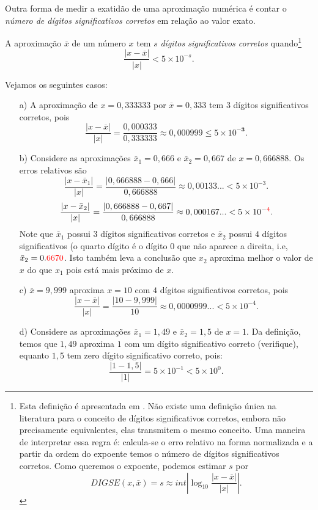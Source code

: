 Outra forma de medir a exatidão de uma aproximação numérica é contar o \emph{número de dígitos significativos corretos} em relação ao valor exato.

\begin{defn}
A aproximação $\overline{x}$ de um número $x$ tem $s$ \emph{dígitos significativos corretos} quando\footnote{Esta definição é apresentada em \cite{Burden2013}. Não existe uma definição única na literatura para o conceito de dígitos significativos corretos, embora não precisamente equivalentes, elas transmitem o mesmo conceito.
Uma maneira de interpretar essa regra é: calcula-se o erro relativo na forma normalizada e a partir da ordem do expoente temos o número de dígitos significativos corretos. Como queremos o expoente, podemos estimar $s$ por
$$ DIGSE(x,\bar{x})=s \approx int \left|\log_{10} \frac{|x-\overline{x}|}{|x|}\right|. $$
}
$$
\frac{|x-\overline{x}|}{|x|} < 5\times 10^{-s}.
$$
\end{defn}


\begin{ex} Vejamos os seguintes casos:
\begin{itemize}
\item[a)] A aproximação de $x=0,333333$ por $\overline{x}=0,333$ tem $3$ dígitos significativos corretos, pois
  \begin{equation*}
    \frac{|x-\overline{x}|}{|x|} = \frac{0,000333}{0,333333} \approx 0,000999 \leq 5\times 10^{-\pmb{3}}.
  \end{equation*}
\item[b)] Considere as aproximações $\bar{x}_1=0,666$ e $\bar{x}_2=0,667$ de $x=0,666888$. Os erros relativos são
  $$
    \frac{|x-\bar{x}_1|}{|x|} = \frac{|0,666888-0,666|}{0,666888} \approx 0,00133...< 5\times 10^{-3}.
  $$
  $$
    \frac{|x-\bar{x}_2|}{|x|} = \frac{|0,666888-0,667|}{0,666888} \approx 0,000167...< 5\times 10^{-{\color{red}{4}}}.
  $$
  Note que $\bar{x}_1$ possui $3$ dígitos significativos corretos e $\bar{x}_2$ possui $4$ dígitos significativos (o quarto dígito é o dígito $0$ que não aparece a direita, i.e, $\bar{x}_2=0.{\color{red}{6670}}$. Isto também leva a conclusão que $x_2$ aproxima melhor o valor de $x$ do que $x_1$ pois está mais próximo de $x$.
  
\item[c)] $\overline{x} = 9,999$ aproxima $x = 10$ com $4$ dígitos significativos corretos, pois  
  \begin{equation*}
    \frac{|x-\overline{x}|}{|x|} = \frac{|10 - 9,999|}{10} \approx 0,0000999...< 5\times 10^{-4}.
  \end{equation*}
\item[d)] Considere as aproximações $\overline{x}_1 = 1,49$ e $\overline{x}_2 = 1,5$ de $x = 1$. Da definição, temos que $1,49$ aproxima $1$ com um dígito significativo correto (verifique), equanto $1,5$ tem zero dígito significativo correto, pois:
  \begin{equation*}
    \frac{|1-1,5|}{|1|} = 5\times 10^{-1} < 5\times 10^{0}.
  \end{equation*}
\end{itemize}
\end{ex}

